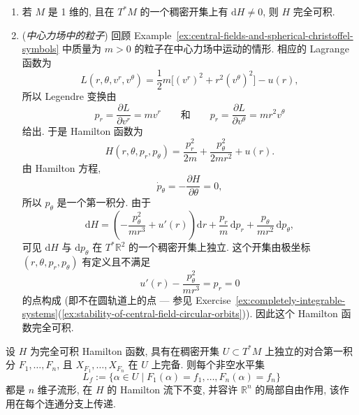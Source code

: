 \begin{RiemannExample}\label{ex:complete-integrability-in-dimension-one-and-central-fields}
\begin{enumerate}[label=(\arabic*),ref=\arabic*,leftmargin=*]
\item 若 $M$ 是 1 维的, 且在 $T^*M$ 的一个稠密开集上有 $\mathrm{d}H\ne0$, 则 $H$ 完全可积.
\item (\emph{中心力场中的粒子}) 回顾 Example~\ref{ex:central-fields-and-spherical-christoffel-symbols} 中质量为 $m>0$ 的粒子在中心力场中运动的情形. 相应的 Lagrange 函数为
\[
  L(r,\theta,v^r,v^\theta)=\frac12 m\bigl[(v^r)^2+r^2(v^\theta)^2\bigr]-u(r),
\]
所以 Legendre 变换由
\[
  p_r=\frac{\partial L}{\partial v^r}=mv^r
  \qquad\text{和}\qquad
  p_r=\frac{\partial L}{\partial v^\theta}=mr^2v^\theta
\]
给出. 于是 Hamilton 函数为
\[
  H(r,\theta,p_r,p_\theta)=\frac{p_r^2}{2m}+\frac{p_\theta^2}{2mr^2}+u(r).
\]
由 Hamilton 方程,
\[
  \dot p_\theta=-\frac{\partial H}{\partial\theta}=0,
\]
所以 $p_\theta$ 是一个第一积分. 由于
\[
  \mathrm{d}H=\left(-\frac{p_\theta^2}{mr^3}+u'(r)\right)\mathrm{d}r
  +\frac{p_r}{m}\,\mathrm{d}p_r+\frac{p_\theta}{mr^2}\,\mathrm{d}p_\theta,
\]
可见 $\mathrm{d}H$ 与 $\mathrm{d}p_\theta$ 在 $T^*\mathbb{R}^2$ 的一个稠密开集上独立. 这个开集由极坐标 $(r,\theta,p_r,p_\theta)$ 有定义且不满足
\[
  u'(r)-\frac{p_\theta^2}{mr^3}=p_r=0
\]
的点构成 (即不在圆轨道上的点 --- 参见 Exercise~\ref{ex:completely-integrable-systems}(\ref{ex:stability-of-central-field-circular-orbits})). 因此这个 Hamilton 函数完全可积.
\end{enumerate}
\end{RiemannExample}

\begin{RiemannProposition}\label{prop:invariant-level-sets-for-integrable-system}
设 $H$ 为完全可积 Hamilton 函数, 具有在稠密开集 $U\subset T^*M$ 上独立的对合第一积分 $F_1,\ldots,F_n$, 且 $X_{F_1},\ldots,X_{F_n}$ 在 $U$ 上完备. 则每个非空水平集
\[
  L_f:=\{\alpha\in U\mid F_1(\alpha)=f_1,\ldots,F_n(\alpha)=f_n\}
\]
都是 $n$ 维子流形, 在 $H$ 的 Hamilton 流下不变, 并容许 $\mathbb{R}^n$ 的局部自由作用, 该作用在每个连通分支上传递.
\end{RiemannProposition}

